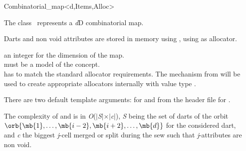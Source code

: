 \ccRefPageBegin

\begin{ccRefClass}{Combinatorial_map<d,Items,Alloc>}


\ccDefinition
  
The class \ccRefName\ represents a \emph{d}D combinatorial map.

Darts and non void attributes are stored in memory using
, using  as allocator.

\ccIsModel
{}

\ccParameters
{} an integer for the dimension of the map.\\
 must be a model of the  concept. \\
 has to match the standard allocator requirements. The   mechanism from  will be used to create appropriate allocators internally with value type .

There are two default template arguments:
 for  and
 from the  header file for .

\ccTypes
{}
\ccGlue
{}


The complexity of  and  is in \emph{O}($|$\emph{S}$|\times|$\emph{c}$|$), \emph{S}
being the set of darts of the orbit
$\orb{\mb{1},\ldots,\mb{i-2},\mb{i+2},\ldots,\mb{d}}$ for the
considered dart, and \emph{c} the biggest \emph{j}-cell merged or
split during the sew such that \emph{j}-attributes are non void.



\end{ccRefClass}
